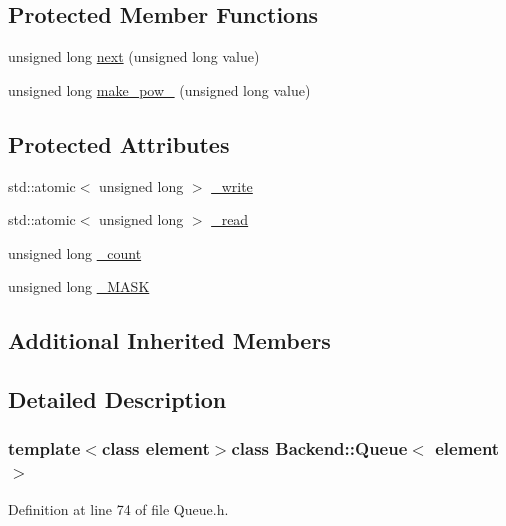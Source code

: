 \subsection*{Protected Member Functions}
\begin{DoxyCompactItemize}
\item 
unsigned long \hyperlink{class_backend_1_1_queue_a91b2f12926d36b547343a91790fe76bb}{next} (unsigned long value)
\item 
unsigned long \hyperlink{class_backend_1_1_queue_a357667a720d3cf0e1867e79e2911ca13}{make\+\_\+pow\+\_} (unsigned long value)
\end{DoxyCompactItemize}
\subsection*{Protected Attributes}
\begin{DoxyCompactItemize}
\item 
std\+::atomic$<$ unsigned long $>$ \hyperlink{class_backend_1_1_queue_ab3d5c4738092cf356b36c56f6ab61554}{\+\_\+write}
\item 
std\+::atomic$<$ unsigned long $>$ \hyperlink{class_backend_1_1_queue_a508eb8c4fedb73fc4abbf26353bdfd82}{\+\_\+read}
\item 
unsigned long \hyperlink{class_backend_1_1_queue_ab49d17e24dc0f8a2e5e44c182c240249}{\+\_\+count}
\item 
unsigned long \hyperlink{class_backend_1_1_queue_ab665bcab528d6bad6c4faab1ae0fc1b4}{\+\_\+\+M\+A\+S\+K}
\end{DoxyCompactItemize}
\subsection*{Additional Inherited Members}


\subsection{Detailed Description}
\subsubsection*{template$<$class element$>$class Backend\+::\+Queue$<$ element $>$}



Definition at line 74 of file Queue.\+h.



